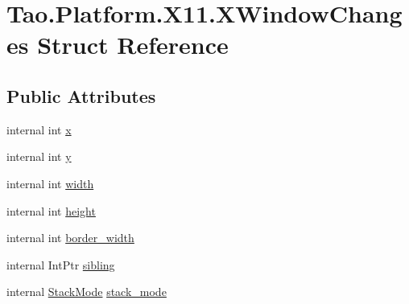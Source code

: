\hypertarget{struct_tao_1_1_platform_1_1_x11_1_1_x_window_changes}{
\section{Tao.Platform.X11.XWindowChanges Struct Reference}
\label{struct_tao_1_1_platform_1_1_x11_1_1_x_window_changes}
}
\subsection*{Public Attributes}
\begin{DoxyCompactItemize}
\item 
internal int \hyperlink{struct_tao_1_1_platform_1_1_x11_1_1_x_window_changes_a1a11c8d0ed68cfe9ce22c350048ec664}{x}
\item 
internal int \hyperlink{struct_tao_1_1_platform_1_1_x11_1_1_x_window_changes_ae1cc32ac49d759b50e5a8a0cf2de7bf0}{y}
\item 
internal int \hyperlink{struct_tao_1_1_platform_1_1_x11_1_1_x_window_changes_a560f22ad1291fafb164f6326f1a1fe07}{width}
\item 
internal int \hyperlink{struct_tao_1_1_platform_1_1_x11_1_1_x_window_changes_a5416841edb8d6789fca497c4f81e5a98}{height}
\item 
internal int \hyperlink{struct_tao_1_1_platform_1_1_x11_1_1_x_window_changes_aacd35eafc0416996279c55b7329a716d}{border\_\-width}
\item 
internal IntPtr \hyperlink{struct_tao_1_1_platform_1_1_x11_1_1_x_window_changes_abd4a955e9453a1a9f5d7dd37e3e9e2f9}{sibling}
\item 
internal \hyperlink{namespace_tao_1_1_platform_1_1_x11_a65e46f815ab9acb6d61db3d389dda9ee}{StackMode} \hyperlink{struct_tao_1_1_platform_1_1_x11_1_1_x_window_changes_ad3e76c50d9a4fe9465c832fa349b7b04}{stack\_\-mode}
\end{DoxyCompactItemize}


